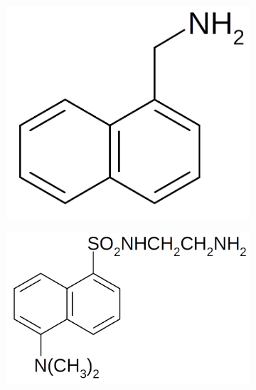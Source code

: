 \documentclass[journal=mamobx,manuscript=article]{achemso}
\begin{document}
\begin{figure}[H]
\begin{subfigure}[b]{0.35\textwidth}
        \includegraphics[scale=0.5]{fig1C.png}
        \caption{}
        \label{fig:C}
    \end{subfigure}
    \begin{subfigure}[b]{0.35\textwidth}
        \includegraphics[scale=0.7]{fig1D.png}
        \caption{}
        \label{fig:D}
    \end{subfigure}
    \begin{subfigure}[b]{0.35\textwidth}

\end{subfigure}
\end{figure}
\end{document}
